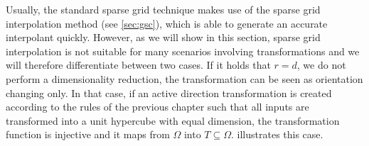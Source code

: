 \documentclass[
  a4paper,  %
  twoside,  %
  bibliography=totoc,
  headsepline,
  cleardoublepage=empty,
  parskip=half,
  draft=false
]{scrbook}
\begin{document}
Usually, the standard sparse grid technique makes use of the sparse grid interpolation method (see \cref{sec:gsc}), which is able to generate an accurate interpolant quickly.
However, as we will show in this section, sparse grid interpolation is not suitable for many scenarios involving transformations and we will therefore differentiate between two cases.
If it holds that $r=d$, \ie we do not perform a dimensionality reduction, the transformation can be seen as orientation changing only.
In that case, if an active direction transformation is created according to the rules of the previous chapter such that all inputs are transformed into a unit hypercube with equal dimension, the transformation function is injective and it maps from $\Omega$ into $T \subseteq \Omega$.
 illustrates this case.
\end{document}
